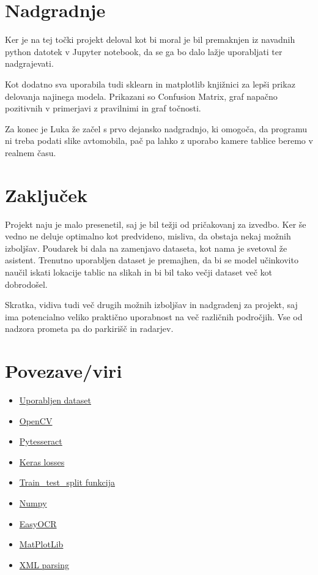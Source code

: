 \documentclass[a4paper,12pt]{article}
\begin{document}
\section*{Nadgradnje}

Ker je na tej točki projekt deloval kot bi moral je bil premaknjen iz navadnih python
datotek v Jupyter notebook, da se ga bo dalo lažje uporabljati ter nadgrajevati.

Kot dodatno sva uporabila tudi sklearn in matplotlib knjižnici za lepši prikaz delovanja
najinega modela. Prikazani so Confusion Matrix, graf napačno pozitivnih v primerjavi
z pravilnimi in graf točnosti.

Za konec je Luka že začel s prvo dejansko nadgradnjo, ki omogoča, da programu ni
treba podati slike avtomobila, pač pa lahko z uporabo kamere tablice beremo v
realnem času.

\section*{Zaključek}
Projekt naju je malo presenetil, saj je bil težji od pričakovanj za izvedbo. Ker še vedno ne deluje optimalno kot predvideno, misliva, da obstaja nekaj možnih izboljšav. Poudarek bi dala na zamenjavo dataseta, kot nama je svetoval že asistent. Trenutno uporabljen dataset je premajhen, da bi se model učinkovito naučil iskati lokacije tablic na slikah in bi bil tako večji dataset več kot dobrodošel.

Skratka, vidiva tudi več
drugih možnih izboljšav in nadgradenj za projekt, saj ima potencialno veliko praktično
uporabnost na več različnih področjih. Vse od nadzora prometa pa do parkirišč in
radarjev.

\section*{Povezave/viri}
\begin{itemize}
    \item \href{https://www.kaggle.com/datasets/andrewmvd/car-plate-detection}{Uporabljen dataset}
    \item \href{https://opencv.org/}{OpenCV}
    \item \href{https://pypi.org/project/pytesseract/}{Pytesseract}
    \item \href{https://keras.io/api/keras\_cv/losses/}{Keras losses}
    \item \href{https://scikit-learn.org/stable/modules/generated/sklearn.model\_selection.train\_test\_split.html}{Train\_test\_split funkcija}
    \item \href{https://numpy.org/}{Numpy}
    \item \href{https://github.com/JaidedAI/EasyOCR}{EasyOCR}
    \item \href{https://matplotlib.org/}{MatPlotLib}
    \item \href{https://www.datacamp.com/tutorial/python-xml-elementtree}{XML parsing}
\end{itemize}
\end{document}
